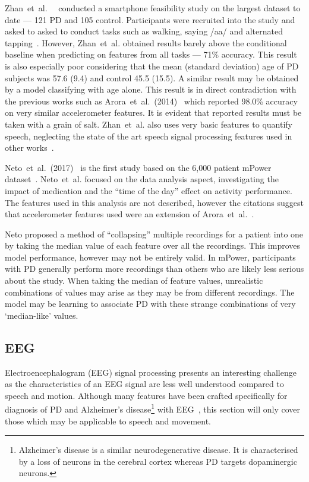 \documentclass[12pt, twoside]{book}
\begin{document}
Zhan~et~al.~~\cite{zhan2016high} conducted a smartphone feasibility study on the largest dataset to date --- 121 PD and 105 control. Participants were recruited into the study and asked to asked to conduct tasks such as walking, saying /aa/ and alternated tapping~\cite{tapping}. However, Zhan~et~al. obtained results barely above the conditional baseline when predicting on features from all tasks --- 71\% accuracy. This result is also especially poor considering that the mean (standard deviation) age of PD subjects was 57.6 (9.4) and control 45.5 (15.5). A similar result may be obtained by a model classifying with age alone. This result is in direct contradiction with the previous works such as Arora~et~al.~(2014)~\cite{arora2014high} which reported 98.0\% accuracy on very similar accelerometer features. It is evident that reported results must be taken with a grain of salt. Zhan~et~al. also uses very basic features to quantify speech, neglecting the state of the art speech signal processing features used in other works~\cite{ostextbook, spoverview}. 


Neto~et~al.~(2017)~\cite{mpowerneto2017analysis} is the first study based on the 6,000 patient mPower dataset~\cite{mpower}. Neto~et~al. focused on the data analysis aspect, investigating the impact of medication and the ``time of the day'' effect on activity performance. The features used in this analysis are not described, however the citations suggest that accelerometer features used were an extension of Arora~et~al.~\cite{arora2014high}. 

Neto proposed a method of ``collapsing'' multiple recordings for a patient into one by taking the median value of each feature over all the recordings. This improves model performance, however may not be entirely valid. In mPower, participants with PD generally perform more recordings than others who are likely less serious about the study. When taking the median of feature values, unrealistic combinations of values may arise as they may be from different recordings. The model may be learning to associate PD with these strange combinations of very `median-like' values.

\subsection{EEG}
\label{eegsigproc}
Electroencephalogram (EEG) signal processing presents an interesting challenge as the characteristics of an EEG signal are less well understood compared to speech and motion. Although many features have been crafted specifically for diagnosis of PD and Alzheimer's disease\footnote{Alzheimer's disease is a similar neurodegenerative disease. It is characterised by a loss of neurons in the cerebral cortex whereas PD targets dopaminergic neurons. } with EEG~\cite{eegnonlinearpd, eegalzheimers}, this section will only cover those which may be applicable to speech and movement.
\end{document}
